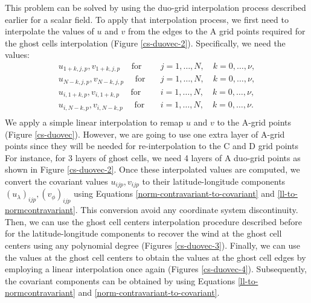 This problem can be solved by using the duo-grid interpolation process described earlier for a scalar field.
To apply that interpolation process, we first need to interpolate the values of $u$ and $v$ from the
edges to the A grid points required for the ghost cells interpolation (Figure \ref{cs-duovec-2}).
Specifically, we need the values:
\begin{align*}
	u_{1+k,j,p}, v_{1+k,j,p} \quad \text{ for} \quad &j=1, \ldots, N, \quad k=0, \ldots, \nu,\\
	u_{N-k,j,p}, v_{N-k,j,p} \quad \text{ for} \quad &j=1, \ldots, N, \quad k=0, \ldots, \nu,\\
	u_{i,1+k,p}, v_{i,1+k,p} \quad \text{ for} \quad &i=1, \ldots, N, \quad k=0, \ldots, \nu,\\
	u_{i,N-k,p}, v_{i,N-k,p} \quad \text{ for} \quad &i=1, \ldots, N, \quad k=0, \ldots, \nu.\\
\end{align*}
We apply a simple linear interpolation to remap $u$ and $v$ to the A-grid points (Figure \ref{cs-duovec}). 
However, we are going to use one extra layer of A-grid points since they will be needed for re-interpolation to the C and D grid points
For instance, for 3 layers of ghost cells, we need 4 layers of A duo-grid points as shown in Figure \ref{cs-duovec-2}.
Once these interpolated values are computed, we convert the covariant values $u_{ijp}, v_{ijp}$
to their latitude-longitude components $(u_{\lambda})_{ijp}, (v_{\phi})_{ijp}$ using Equations \eqref{norm-contravariant-to-covariant} and
\eqref{ll-to-normcontravariant}. This conversion avoid any coordinate system discontinuity.
Then, we can use the ghost cell centers interpolation procedure described before for the latitude-longitude components
to recover the wind at the ghost cell centers using any polynomial degree (Figures \ref{cs-duovec-3}).
Finally, we can use the values at the ghost cell centers to obtain the values at the ghost cell edges
by employing a linear interpolation once again (Figures \ref{cs-duovec-4}).
Subsequently, the covariant components can be obtained by using Equations \eqref{ll-to-normcontravariant} and \eqref{norm-contravariant-to-covariant}.

